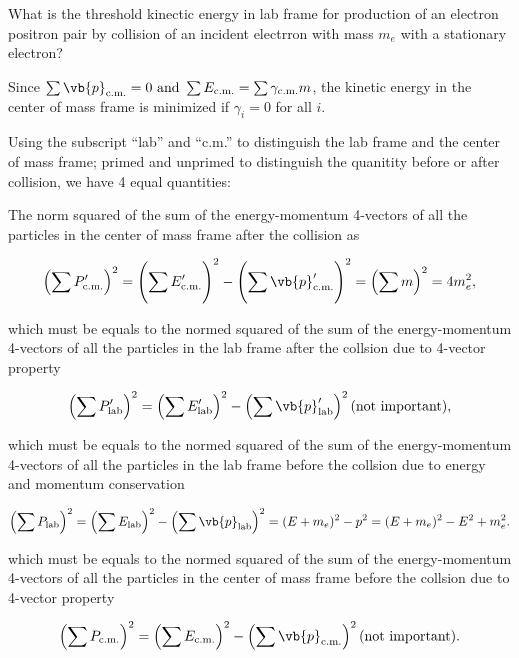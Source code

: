 \documentclass[english,a4paper,12pt]{report}
\begin{document}
{What is the threshold kinectic energy in lab frame for production of an electron positron pair by collision of an incident electrron with mass \(m_{e} \) with a stationary electron? }
{Since \(\sum \vb{p}_{\text{c.m.}}  =0 \text { and } \sum E_{\text{c.m.}} = \sum \gamma _{\text{c.m.}}m  \), the kinetic energy in the center of mass frame is minimized if \(\gamma _{i} = 0\) for all \(i\). 

Using the subscript ``lab'' and ``c.m.'' to distinguish the lab frame and the center of mass frame; primed and unprimed to distinguish the quanitity before or after collision, we have 4 equal quantities:

The norm squared of the sum of the energy-momentum 4-vectors of all the particles in the center of mass frame after the collision as 

\begin{equation}
    \left( \sum P_{\text{c.m.}}' \right)^2 = \left( \sum_{}^{} E_{\text{c.m.}}'  \right) ^2 - \left( \sum_{}^{} \vb{p}_{\text{c.m.}}'    \right) ^2  = \left( \sum m \right)^2 = 4 m_{e}^2,
\end{equation}

which must be equals to the normed squared of the sum of the energy-momentum 4-vectors of all the particles in the lab frame after the collsion due to 4-vector property

\begin{equation}
    \left(\sum P_{\text{lab} }' \right)^2 = \left(\sum E_{\text{lab} }'\right)^2 - \left( \sum \vb{p} _{\text{lab} }' \right)^2 \text{(not important)},
\end{equation}

which must be equals to the normed squared of the sum of the energy-momentum 4-vectors of all the particles in the lab frame before the collsion due to energy and momentum conservation

\begin{equation}
    \left(\sum P_{\text{lab} } \right)^2 = \left(\sum E_{\text{lab} }\right)^2 - \left( \sum \vb{p} _{\text{lab} } \right)^2 = (E+m_{e} )^2 - p^2 = (E+m_{e} )^2 - E^2 + m_{e}^2. 
\end{equation}

which must be equals to the normed squared of the sum of the energy-momentum 4-vectors of all the particles in the center of mass frame before the collsion due to 4-vector property

\begin{equation}
    \left(\sum P_{\text{c.m.} } \right)^2 = \left(\sum E_{\text{c.m.} }\right)^2 - \left( \sum \vb{p} _{\text{c.m.} } \right)^2 \text{(not important)}. 
\end{equation}

}
\end{document}
